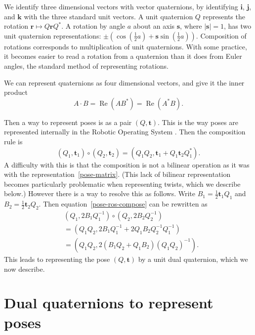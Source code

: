 \documentclass[reqno,12pt]{amsart}
\newcommand\bi{\bm i}
\newcommand\bj{\bm j}
\newcommand\bk{\bm k}
\DeclareMathOperator\realpart{Re}
\begin{document}
We identify three dimensional vectors with vector quaternions, by identifying $\bi$, $\bj$, and $\bk$ with the three standard unit vectors.  A unit quaternion $Q$ represents the rotation $\bm r \mapsto Q \bm r Q^*$.  A rotation by angle $a$ about an axis $\bm s$, where $|\bm s| = 1$, has two unit quaternion representations: $\pm(\cos(\tfrac12 a) + \bm s \sin(\tfrac12 a))$.  Composition of rotations corresponds to multiplication of unit quaternions.  With some practice, it becomes easier to read a rotation from a quaternion than it does from Euler angles, the standard method of representing rotations.

We can represent quaternions as four dimensional vectors, and give it the inner product
\begin{equation}
A \cdot B = \realpart(A B^*) = \realpart(A^* B) .
\end{equation}

Then a way to represent poses is as a pair $(Q,\bm t)$.  This is the way poses are represented internally in the Robotic Operating System \cite{ros}.  Then the composition rule is
\begin{equation}
\label{pose-ros-compose}
(Q_1, \bm t_1) \circ (Q_2, \bm t_2) = (Q_1 Q_2, \bm t_1 + Q_1 \bm t_2 Q_1^*).
\end{equation}
A difficulty with this is that the composition is not a bilinear operation as it was with the representation~\eqref{pose-matrix}.  (This lack of bilinear representation becomes particularly problematic when representing twists, which we describe below.)  However there is a way to resolve this as follows.  Write $B_1 = \tfrac12 \bm t_1 Q_1$ and $B_2 = \tfrac12 \bm t_2 Q_2$.  Then equation~\eqref{pose-ros-compose} can be rewritten as
\begin{equation}
\begin{aligned}
& (Q_1, 2 B_1 Q_1^{-1}) \circ (Q_2, 2 B_2 Q_2^{-1}) 
\\& = (Q_1 Q_2, 2 B_1 Q_1^{-1}+ 2 Q_1 B_2 Q_2^{-1} Q_1^{-1})
\\& = (Q_1 Q_2, 2 (B_1 Q_2 + Q_1 B_2)(Q_1 Q_2)^{-1}) .
\end{aligned}
\end{equation}
This leads to representing the pose $(Q,\bm t)$ by a unit dual quaternion, which we now describe.

\section{Dual quaternions to represent poses}
\label{sec poses}
\end{document}
